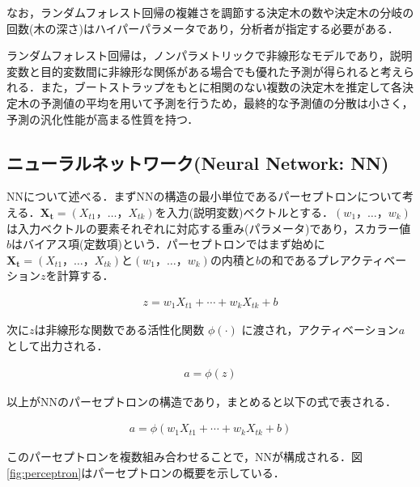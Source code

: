 \documentclass[a4paper，11pt]{jsarticle}
\begin{document}
\noindent
なお，ランダムフォレスト回帰の複雑さを調節する決定木の数や決定木の分岐の回数(木の深さ)はハイパーパラメータであり，分析者が指定する必要がある．

ランダムフォレスト回帰は，ノンパラメトリックで非線形なモデルであり，説明変数と目的変数間に非線形な関係がある場合でも優れた予測が得られると考えられる．また，ブートストラップをもとに相関のない複数の決定木を推定して各決定木の予測値の平均を用いて予測を行うため，最終的な予測値の分散は小さく，予測の汎化性能が高まる性質を持つ．

\subsection{ニューラルネットワーク(Neural Network: NN)}

NNについて述べる．まずNNの構造の最小単位であるパーセプトロンについて考える．$\bm{X_t}=(X_{t1}，\ldots，X_{tk})$を入力(説明変数)ベクトルとする．$(w_1，\ldots，w_k)$は入力ベクトルの要素それぞれに対応する重み(パラメータ)であり，スカラー値$b$はバイアス項(定数項)という．パーセプトロンではまず始めに$\bm{X_t}=(X_{t1}，\ldots，X_{tk})$と$(w_1，\ldots，w_k)$の内積と$b$の和であるプレアクティベーション$z$を計算する．

\begin{equation}
  \begin{split}
    z = w_1 X_{t1} + \cdots + w_k X_{tk} + b
  \end{split}
\end{equation}

\noindent
次に$z$は非線形な関数である活性化関数 $\phi(\cdot)$ に渡され，アクティベーション$a$として出力される．

\begin{equation}
  \begin{split}
    a = \phi(z)
  \end{split}
\end{equation}

\noindent
以上がNNのパーセプトロンの構造であり，まとめると以下の式で表される．

\begin{equation}
  \begin{split}
    a = \phi \left(w_1 X_{t1} + \cdots + w_k X_{tk} + b \right)
  \end{split}
\end{equation}

\noindent
このパーセプトロンを複数組み合わせることで，NNが構成される．図\ref{fig:perceptron}はパーセプトロンの概要を示している．
\end{document}
